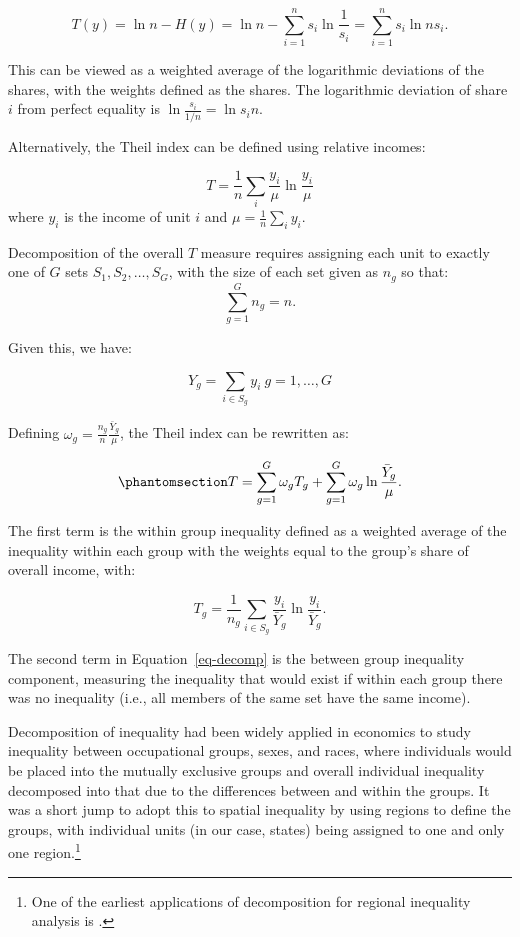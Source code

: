 \documentclass[
  a4paper, 
  twoside,
  final
]{article}
\begin{document}
\[T(y) = \ln n - H(y) = \ln n - \sum_{i=1}^n s_i \ln \frac{1}{s_i}=\sum_{i=1}^n s_i \ln n s_i.\]

This can be viewed as a weighted average of the logarithmic deviations
of the shares, with the weights defined as the shares. The logarithmic
deviation of share \(i\) from perfect equality is
\(\ln \frac{s_i}{1/n} = \ln s_i n\).

Alternatively, the Theil index can be defined using relative incomes:

\[T = \frac{1}{n} \sum_i \frac{y_i}{\mu} \ln \frac{y_i}{\mu}\] where
\(y_i\) is the income of unit \(i\) and
\(\mu = \frac{1}{n} \sum_i y_i\).

Decomposition of the overall \(T\) measure requires assigning each unit
to exactly one of \(G\) sets \(S_1, S_2, \ldots, S_G\), with the size of
each set given as \(n_g\) so that: \[
\sum_{g=1}^G n_g = n.
\]

Given this, we have:

\[Y_g = \sum_{i \in S_g} y_i \ g=1,\ldots,G\]

Defining \(\omega_g = \frac{n_g}{n} \frac{\bar{Y}_g}{\mu}\), the Theil
index can be rewritten as:

\begin{equation}\phantomsection\label{eq-decomp}{
T = \sum_{g=1}^G \omega_g T_g + \sum_{g=1}^G \omega_g \ln
\frac{\bar{Y}_g}{\mu}.
}\end{equation}

The first term is the within group inequality defined as a weighted
average of the inequality within each group with the weights equal to
the group's share of overall income, with:

\[T_g = \frac{1}{n_g} \sum_{i \in S_g} \frac{y_i}{\bar{Y}_g} \ln \frac{y_i}{\bar{Y}_g}.\]

The second term in Equation~\ref{eq-decomp} is the between group
inequality component, measuring the inequality that would exist if
within each group there was no inequality (i.e., all members of the same
set have the same income).

Decomposition of inequality had been widely applied in economics to
study inequality between occupational groups, sexes, and races, where
individuals would be placed into the mutually exclusive groups and
overall individual inequality decomposed into that due to the
differences between and within the groups. It was a short jump to adopt
this to spatial inequality by using regions to define the groups, with
individual units (in our case, states) being assigned to one and only
one region.\footnote{One of the earliest applications of decomposition
  for regional inequality analysis is
  \citet{theil1967EconomicsInformation}.}
\end{document}
